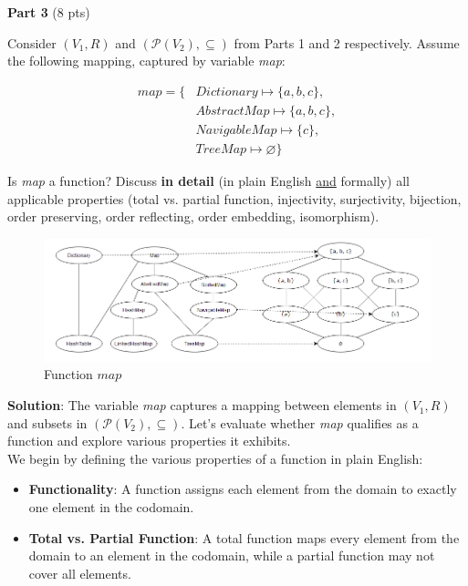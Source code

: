 \documentclass[12pt]{article}
\begin{document}
\begin{spacing}{1.5}
	\noindent \textbf{Part 3} (8 pts)
		
	\noindent Consider $(V_1, R)$ and $(\mathcal{P}(V_2), \subseteq)$ from Parts 1 and 2 respectively. Assume the following mapping, captured by variable \textit{map}:
		
	\begin{align*}
		map = \{ & Dictionary \mapsto \{a,b,c\},  \\
		         & AbstractMap \mapsto \{a,b,c\}, \\
		         & NavigableMap \mapsto \{c\},    \\
		         & TreeMap \mapsto \varnothing\}  
	\end{align*}
		
	\noindent Is \textit{map} a function? Discuss \textbf{in detail} (in plain English \uline{and} formally) all applicable properties (total vs. partial function, injectivity, surjectivity, bijection, order preserving, order reflecting, order embedding, isomorphism).\\
	
	\begin{figure}[htp]
		\centering
		\includegraphics[width=1.1\textwidth]{FunctionMapping_6_3.png}
		\caption{Function $map$}
		\label{fig:figure}
	\end{figure}
	
	\noindent \textbf{Solution}: The variable \textit{map} captures a mapping between elements in $(V_1, R)$ and subsets in $(\mathcal{P}(V_2), \subseteq)$. Let's evaluate whether \textit{map} qualifies as a function and explore various properties it exhibits.\\
	
	\noindent We begin by defining the various properties of a function in plain English:
	
	\begin{itemize}
		\item \textbf{Functionality}: A function assigns each element from the domain to exactly one element in the codomain.
		              
		\item \textbf{Total vs. Partial Function}: A total function maps every element from the domain to an element in the codomain, while a partial function may not cover all elements.
		          

\end{itemize}
\end{spacing}
\end{document}
